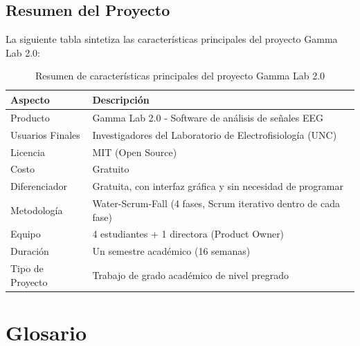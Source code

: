 \documentclass{article}
\begin{document}
\subsection{Resumen del Proyecto}

La siguiente tabla sintetiza las características principales del proyecto Gamma Lab 2.0:

\begin{table}[H]
    \centering
    \begin{tabular}{|p{4cm}|p{9cm}|}
        \hline
        \textbf{Aspecto} & \textbf{Descripción} \\
        \hline
        Producto & Gamma Lab 2.0 - Software de análisis de señales EEG \\
        \hline
        Usuarios Finales & Investigadores del Laboratorio de Electrofisiología (UNC) \\
        \hline
        Licencia & MIT (Open Source) \\
        \hline
        Costo & Gratuito \\
        \hline
        Diferenciador & Gratuita, con interfaz gráfica y sin necesidad de programar \\
        \hline
        Metodología & Water-Scrum-Fall (4 fases, Scrum iterativo dentro de cada fase) \\
        \hline
        Equipo & 4 estudiantes + 1 directora (Product Owner) \\
        \hline
        Duración & Un semestre académico (16 semanas) \\
        \hline
        Tipo de Proyecto & Trabajo de grado académico de nivel pregrado \\
        \hline
    \end{tabular}
    \caption{Resumen de características principales del proyecto Gamma Lab 2.0}
    \label{tab:resumen_proyecto}
\end{table}

\section{Glosario}
\end{document}

